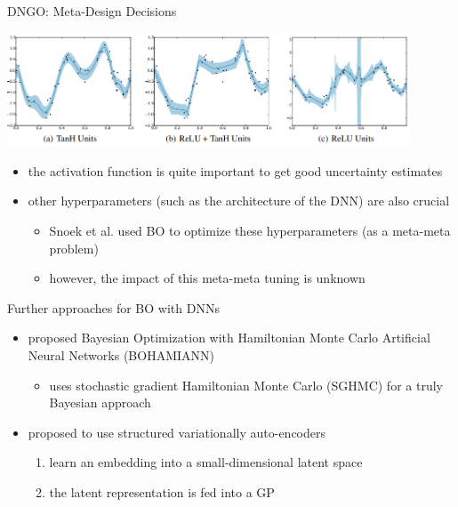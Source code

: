 \begin{frame}[c,fragile]{DNGO: Meta-Design Decisions~}

\centering
\includegraphics[width=0.9\textwidth]{images/dngo_activation.png}

\begin{itemize}
	\item the activation function is quite important to get good uncertainty estimates
	\item other hyperparameters (such as the architecture of the DNN) are also crucial
	\begin{itemize}
		\item Snoek et al. used BO to optimize these hyperparameters (as a meta-meta problem)
		\item however, the impact of this meta-meta tuning is unknown
	\end{itemize}
\end{itemize}

\end{frame}

\begin{frame}[c,fragile]{Further approaches for BO with DNNs}

\begin{itemize}
	\item {} proposed  Bayesian Optimization with Hamiltonian Monte Carlo Artificial Neural
	Networks (BOHAMIANN) 
	\begin{itemize}
		\item uses stochastic gradient	Hamiltonian Monte Carlo (SGHMC) for a truly Bayesian approach 
	\end{itemize}
	\medskip
	\pause
	\item {} proposed to use structured variationally auto-encoders
	\begin{enumerate}
		\item learn an embedding into a small-dimensional latent space
		\item the latent representation is fed into a GP
	\end{enumerate}
\end{itemize}

\end{frame}

